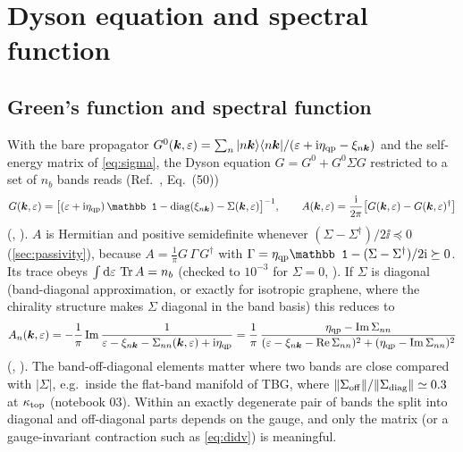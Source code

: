 \section{Dyson equation and spectral function}
\label{sec:spectral}

\subsection{Green's function and spectral function}

With the bare propagator $G^0(\bm k,\varepsilon)=\sum_n|n\bm k\rangle\langle n\bm k|/(\varepsilon+\mathrm i\eta_{\rm qp}-\xi_{n\bm k})$ and the
self-energy matrix of \cref{eq:sigma}, the Dyson equation $G=G^0+G^0\Sigma G$ restricted to a set of $n_b$
bands reads (Ref.~\cite{Wei2025}, Eq.~(50))
\begin{equation}
G(\bk,\eps)=\bigl[(\eps+\ii\eta_{\rm qp})\,\mathbb 1-\diag(\xi_{n\bk})-\Sigma(\bk,\eps)\bigr]^{-1},
\qquad
A(\bk,\eps)=\frac{\ii}{2\pi}\bigl[G(\bk,\eps)-G(\bk,\eps)^\dagger\bigr]
\label{eq:dyson}
\end{equation}
(, ). $A$ is Hermitian and positive
semidefinite whenever $(\Sigma-\Sigma^\dagger)/2\ii\preceq0$ (\cref{sec:passivity}), because
$A=\frac1\pi G\,\Gamma\,G^\dagger$ with $\Gamma=\eta_{\rm qp}\mathbb1-(\Sigma-\Sigma^\dagger)/2\ii\succeq0$. Its trace
obeys $\int\mathrm d\varepsilon\,\operatorname{Tr} A=n_b$ (checked to $10^{-3}$ for $\Sigma=0$, ).
If $\Sigma$ is diagonal (band-diagonal approximation, or exactly for isotropic graphene, where the chirality
structure makes $\Sigma$ diagonal in the band basis) this reduces to
\begin{equation}
A_n(\bm k,\varepsilon)=-\frac1\pi\operatorname{Im}\frac{1}{\varepsilon-\xi_{n\bm k}-\Sigma_{nn}(\bm k,\varepsilon)+\mathrm i\eta_{\rm qp}}
=\frac1\pi\,\frac{\eta_{\rm qp}-\operatorname{Im}\Sigma_{nn}}{(\varepsilon-\xi_{n\bm k}-\operatorname{Re}\Sigma_{nn})^2+(\eta_{\rm qp}-\operatorname{Im}\Sigma_{nn})^2}
\label{eq:Ascalar}
\end{equation}
(, ). The band-off-diagonal
elements matter where two bands are close compared with $|\Sigma|$, e.g.\ inside the flat-band manifold of TBG,
where $\|\Sigma_{\rm off}\|/\|\Sigma_{\rm diag}\|\simeq0.3$ at $\kappa_{\rm top}$ (notebook 03). Within an exactly
degenerate pair of bands the split into diagonal and off-diagonal parts depends on the gauge, and only the
matrix (or a gauge-invariant contraction such as \cref{eq:didv}) is meaningful.

